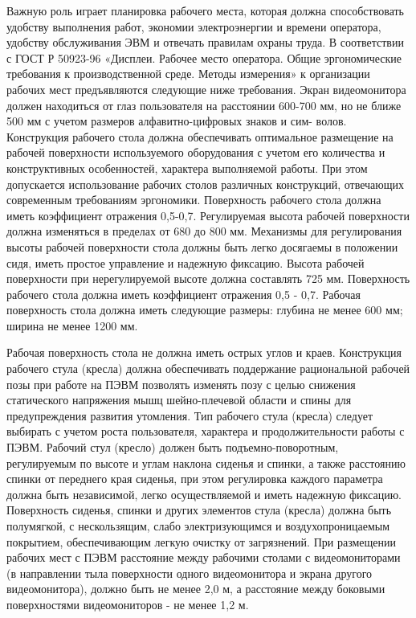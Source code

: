 Важную роль играет планировка рабочего места, которая должна способствовать удобству выполнения работ, экономии электроэнергии и времени оператора, удобству обслуживания ЭВМ и отвечать правилам охраны труда.
В соответствии с ГОСТ Р 50923-96 «Дисплеи. Рабочее место оператора. Общие эргономические требования к производственной среде. Методы измерения» к организации рабочих мест предъявляются следующие ниже требования.
Экран видеомонитора должен находиться от глаз пользователя на расстоянии 600-700 мм, но не ближе 500 мм с учетом размеров алфавитно-цифровых знаков и сим- волов. Конструкция рабочего стола должна обеспечивать оптимальное размещение на рабочей поверхности используемого оборудования с учетом его количества и конструктивных особенностей, характера выполняемой работы. При этом допускается использование рабочих столов различных конструкций, отвечающих современным требованиям эргономики. Поверхность рабочего стола должна иметь коэффициент отражения 0,5-0,7. Регулируемая высота рабочей поверхности должна изменяться в пределах от 680 до 800 мм. Механизмы для регулирования высоты рабочей поверхности стола должны быть легко досягаемы в положении сидя, иметь простое управление и надежную фиксацию. Высота рабочей поверхности при нерегулируемой высоте должна составлять 725 мм. Поверхность рабочего стола должна иметь коэффициент отражения 0,5 - 0,7. Рабочая поверхность стола должна иметь следующие размеры: глубина не менее 600 мм; ширина не менее 1200 мм.

Рабочая поверхность стола не должна иметь острых углов и краев. Конструкция рабочего стула (кресла) должна обеспечивать поддержание рациональной рабочей позы при работе на ПЭВМ позволять изменять позу с целью снижения статического напряжения мышц шейно-плечевой области и спины для предупреждения развития утомления. Тип рабочего стула (кресла) следует выбирать с учетом роста пользователя, характера и продолжительности работы с ПЭВМ.
Рабочий стул (кресло) должен быть подъемно-поворотным, регулируемым по высоте и углам наклона сиденья и спинки, а также расстоянию спинки от переднего края сиденья, при этом регулировка каждого параметра должна быть независимой, легко осуществляемой и иметь надежную фиксацию. Поверхность сиденья, спинки и других элементов стула (кресла) должна быть полумягкой, с нескользящим, слабо электризующимся и воздухопроницаемым покрытием, обеспечивающим легкую очистку от загрязнений.
При размещении рабочих мест с ПЭВМ расстояние между рабочими столами с видеомониторами (в направлении тыла поверхности одного видеомонитора и экрана другого видеомонитора), должно быть не менее 2,0 м, а расстояние между боковыми поверхностями видеомониторов - не менее 1,2 м.

